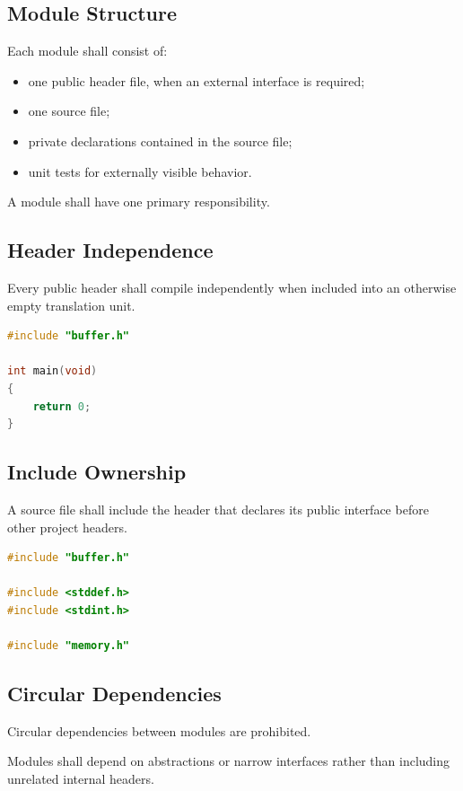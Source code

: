 \subsection{Module Structure}

Each module shall consist of:

\begin{itemize}
	\item one public header file, when an external interface is required;
	\item one source file;
	\item private declarations contained in the source file;
	\item unit tests for externally visible behavior.
\end{itemize}

A module shall have one primary responsibility.

\subsection{Header Independence}

Every public header shall compile independently when included into an otherwise empty translation unit.

\begin{lstlisting}[language=C]
#include "buffer.h"

int main(void)
{
	return 0;
}
\end{lstlisting}

\subsection{Include Ownership}

A source file shall include the header that declares its public interface before other project headers.

\begin{lstlisting}[language=C]
#include "buffer.h"

#include <stddef.h>
#include <stdint.h>

#include "memory.h"
\end{lstlisting}

\subsection{Circular Dependencies}

Circular dependencies between modules are prohibited.

Modules shall depend on abstractions or narrow interfaces rather than including unrelated internal headers.
